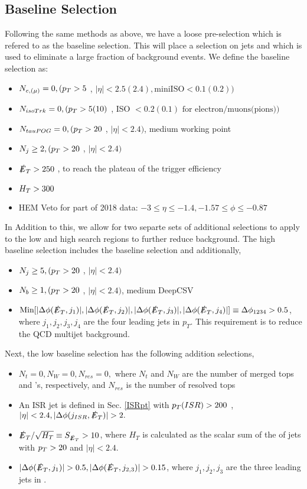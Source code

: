 \subsection{Baseline Selection} \label{Baseline}

Following the same methods as above, we have a loose pre-selection which is refered to as the baseline selection. This will place a selection on jets and \met which is used to eliminate a large fraction of background events. We define the baseline selection as:
\begin{itemize}
	\item $N_{e,(\mu)} = 0, (p_{T}>5$ \GeV, $|\eta|<2.5(2.4), \text{miniISO}<0.1(0.2))$
	\item $N_{isoTrk} = 0, (p_{T} > 5 (10)$ \GeV, ISO $< 0.2(0.1) \text{ for electron/muons(pions)})$
	\item $N_{tauPOG} = 0, (p_{T} > 20$ \GeV, $|\eta|<2.4)$, medium working point
	\item $N_{j} \geq 2, (p_{T} >20$ \GeV, $|\eta|<2.4)$
	\item $\slashed{E}_{T} >250$ \GeV, to reach the plateau of the trigger efficiency
	\item $H_{T}>300$ \GeV
	\item HEM Veto for part of 2018 data: $-3\leq\eta\leq-1.4, -1.57\leq\phi\leq-0.87$
\end{itemize}
In Addition to this, we allow for two separte sets of additional selections to apply to the low and high \dm{} search regions to further reduce background. The high \dm{} baseline selection includes the baseline selection and additionally,
\begin{itemize}
	\item $N_j\geq 5, (p_{T} >20$ \GeV, $|\eta|<2.4)$
	\item $N_b\geq 1, (p_{T} >20$ \GeV, $|\eta|<2.4)$, medium DeepCSV
	\item $\text{Min}[|\Delta\phi(\slashed{E}_{T},j_1)|,|\Delta\phi(\slashed{E}_{T},j_2)|,|\Delta\phi(\slashed{E}_{T},j_3)|,|\Delta\phi(\slashed{E}_{T},j_4)|]\equiv\Delta\phi_{1234}>0.5$, where $j_1, j_2, j_3, j_4$ are the four leading jets in $p_T$. This requirement is to reduce the QCD multijet background. 
\end{itemize}
Next, the low \dm{} baseline selection has the following addition selections,
\begin{itemize}
	\item $N_t=0, N_W=0,N_{res}=0,$ where $N_t$ and $N_W$ are the number of merged tops and \W's, respectively, and $N_{res}$ is the number of resolved tops
	\item An ISR jet is defined in Sec. \ref{ISRpt} with $p_{T}(ISR)>200$ \GeV, $|\eta|<2.4, |\Delta\phi(j_{ISR},\met)|>2.$
	\item $\slashed{E}_{T}/\sqrt{H_{T}}\equiv S_{\slashed{E}_{T}}>10$, where $H_T$ is calculated as the scalar sum of the \pt of jets with $p_{T} >20$ \GeV{} and $|\eta|<2.4.$
	\item $|\Delta\phi(\met,j_1)|>0.5, |\Delta\phi(\met,j_{2,3})|>0.15$, where $j_1,j_2,j_3$ are the three leading jets in \pt. 
\end{itemize}

